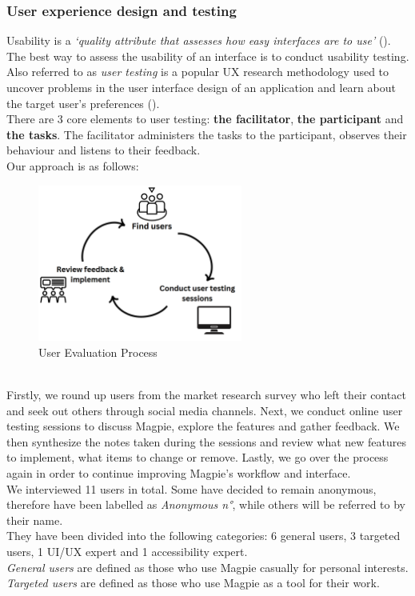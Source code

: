 \subsubsection{User experience design and testing}
Usability is a \emph{`quality attribute that assesses how easy interfaces are to use'} (\cite{usabilitycomponentsnielsen}). The best way to assess the usability of an interface is to conduct usability testing.\\
Also referred to as \emph{user testing} is a popular UX research methodology used to uncover problems in the user interface design of an application and learn about the target user's preferences (\cite{usertestingdefinition}).\\

\noindent There are 3 core elements to user testing: \textbf{the facilitator}, \textbf{the participant} and \textbf{the tasks}. The facilitator administers the tasks to the participant, observes their behaviour and listens to their feedback.\\

\noindent Our approach is as follows:
\begin{figure}[h!]
    \centering
    \includegraphics[width=0.6\textwidth]{images/user-eval-process.png}
    \caption{User Evaluation Process}
\end{figure}\\
Firstly, we round up users from the market research survey who left their contact and seek out others through social media channels. Next, we conduct online user testing sessions to discuss Magpie, explore the features and gather feedback. We then synthesize the notes taken during the sessions and review what new features to implement, what items to change or remove. Lastly, we go over the process again in order to continue improving Magpie's workflow and interface.\\
We interviewed 11 users in total. Some have decided to remain anonymous, therefore have been labelled as \emph{Anonymous n°}, while others will be referred to by their name. \\ They have been divided into the following categories: 6 general users, 3 targeted users, 1 UI/UX expert and 1 accessibility expert.\\
\emph{General users} are defined as those who use Magpie casually for personal interests.\\ \emph{Targeted users} are defined as those who use Magpie as a tool for their work.

